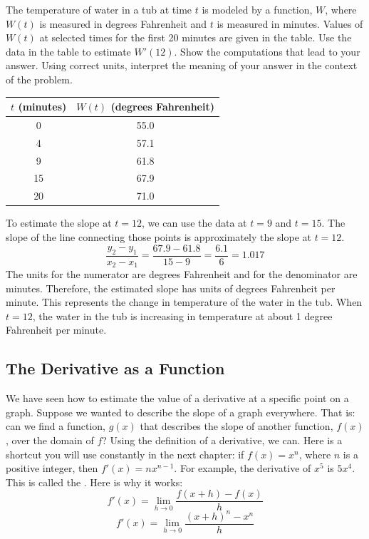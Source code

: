 \begin{Exercise} The temperature of water in a tub 
	at time $t$ is modeled by a function, $W$, where $W(t)$ is measured in degrees 
	Fahrenheit and $t$ is measured in minutes. Values of $W(t)$ at selected times 
	for the first 20 minutes are given in the table. Use the data in the table to 
	estimate $W'(12)$. Show the computations that lead to your answer. Using 
	correct units, interpret the meaning of your answer in the context of the 
	problem. \\
	\begin{tabular}{c|c}\hline
	$t$ (minutes) & $W(t)$ (degrees Fahrenheit)\\
	\hline
	0 & 55.0\\
	\hline
	4 & 57.1\\
	\hline
	9 & 61.8\\
	\hline
	15 & 67.9\\
	\hline
	20 & 71.0\\
	\hline
	\end{tabular}	 
\end{Exercise}

\begin{Answer}[ref=slope1]
	To estimate the slope at $t = 12$, we can use the data at $t = 9$ and $t = 
	15$. The slope of the line connecting those points is approximately the 
	slope at $t = 12$. $$\frac{y_2 - y_1}{x_2 - x_1} = \frac{67.9 - 61.8}{15 - 9} 
	= \frac{6.1}{6} = 1.017$$ The units for the numerator are degrees Fahrenheit 
	and for the denominator are minutes. Therefore, the estimated slope has units 
	of degrees Fahrenheit per minute. This represents the change in temperature 
	of the water in the tub. When $t = 12$, the water in the tub is increasing in 
	temperature at about 1 degree Fahrenheit per minute. 
\end{Answer}

\subsection{The Derivative as a Function}
We have seen how to estimate the value of a derivative at a specific point on 
a graph. Suppose we wanted to describe the slope of a graph everywhere. That 
is: can we find a function, $g(x)$ that describes the slope of another 
function, $f(x)$, over the domain of $f$? Using the definition of a 
derivative, we can.
Here is a shortcut you will use constantly in the next chapter: if
$f(x) = x^n$, where $n$ is a positive integer, then $f'(x) = nx^{n - 1}$.
For example, the derivative of $x^5$ is $5x^4$. This is called the
. Here is why it works:
$$f'(x) = \lim_{h \to 0} \frac{f(x + h) - f(x)}{h}$$
$$f'(x) = \lim_{h \to 0} \frac{(x + h)^n - x^n}{h}$$

